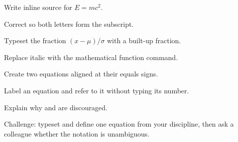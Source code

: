\chapterexercisestitle
\begin{chapterexercises}
  \item Write inline source for $E=mc^2$.
  \item Correct  so both letters form the subscript.
  \item Typeset the fraction $(x-\mu)/\sigma$ with a built-up fraction.
  \item Replace italic  with the mathematical function command.
  \item Create two equations aligned at their equals signs.
  \item Label an equation and refer to it without typing its number.
  \item Explain why \code{\$\$} and  are discouraged.
  \item Challenge: typeset and define one equation from your discipline, then
        ask a colleague whether the notation is unambiguous.
\end{chapterexercises}
